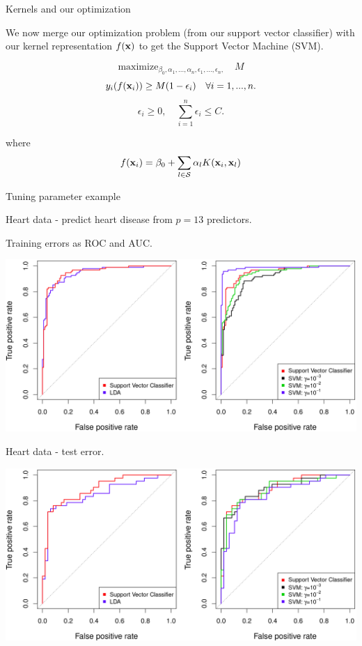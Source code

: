 \documentclass[ignorenonframetext,]{beamer}
\begin{document}
\begin{frame}

\begin{block}{Kernels and our optimization}

We now merge our optimization problem (from our support vector
classifier) with our kernel representation \(f({\bf x})\) to get the
Support Vector Machine (SVM).

\[\mathrm{maximize}_{\beta_0,\alpha_1,...,\alpha_n,\epsilon_1,...,\epsilon_n,} \quad M \]
\[y_i(f({\bf x}_i))\geq M(1-\epsilon_i) \quad  \forall i=1,...,n.\]
\[\epsilon_i\geq 0, \quad \sum_{i=1}^n \epsilon_i \leq C.\]

where
\[f({\bf x}_i)=\beta_0 +\sum_{l\in \cal{S}} \alpha_l K({\bf x}_i,{\bf x}_l)\]

\end{block}

\end{frame}

\begin{frame}

\begin{block}{Tuning parameter example}

Heart data - predict heart disease from \(p=13\) predictors.

Training errors as ROC and AUC.

\includegraphics{../ISLR/Chapter9/9.10.png}

\end{block}

\end{frame}

\begin{frame}

Heart data - test error.

\includegraphics{../ISLR/Chapter9/9.11.png}

\end{frame}
\end{document}
